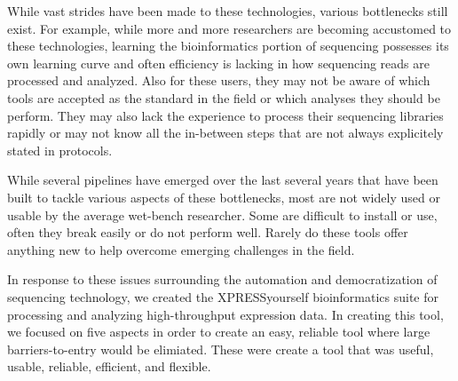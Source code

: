 \documentclass[11pt, a4paper, oneside]{article}
\begin{document}
While vast strides have been made to these technologies, various bottlenecks still exist. For example, while more and more researchers are becoming accustomed to these technologies, learning the bioinformatics portion of sequencing possesses its own learning curve and often efficiency is lacking in how sequencing reads are processed and analyzed. Also for these users, they may not be aware of which tools are accepted as the standard in the field or which analyses they should be perform. They may also lack the experience to process their sequencing libraries rapidly or may not know all the in-between steps that are not always explicitely stated in protocols.

While several pipelines have emerged over the last several years that have been built to tackle various aspects of these bottlenecks, most are not widely used or usable by the average wet-bench researcher. Some are difficult to install or use, often they break easily or do not perform well. Rarely do these tools offer anything new to help overcome emerging challenges in the field.

In response to these issues surrounding the automation and democratization of sequencing technology, we created the XPRESSyourself bioinformatics suite for processing and analyzing high-throughput expression data. In creating this tool, we focused on five aspects in order to create an easy, reliable tool where large barriers-to-entry would be elimiated. These were create a tool that was useful, usable, reliable, efficient, and flexible.
\end{document}
